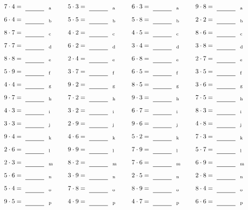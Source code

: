 \documentclass
[
  draft    = true,
  fontsize = 11pt,
  parskip  = half-
]
{scrartcl}
\begin{document}
\par\vfill\par
\begin{align*}
    \pline{7\cdot4}&=\rline{a}
  & \pline{5\cdot3}&=\rline{a}
  & \pline{6\cdot3}&=\rline{a}
  & \pline{9\cdot8}&=\rline{a} \\[1ex]
    \pline{6\cdot4}&=\rline{b}
  & \pline{5\cdot5}&=\rline{b}
  & \pline{5\cdot8}&=\rline{b}
  & \pline{2\cdot2}&=\rline{b} \\[1ex]
    \pline{8\cdot7}&=\rline{c}
  & \pline{4\cdot2}&=\rline{c}
  & \pline{4\cdot5}&=\rline{c}
  & \pline{8\cdot6}&=\rline{c} \\[1ex]
    \pline{7\cdot7}&=\rline{d}
  & \pline{6\cdot2}&=\rline{d}
  & \pline{3\cdot4}&=\rline{d}
  & \pline{3\cdot8}&=\rline{d} \\[1ex]
    \pline{8\cdot8}&=\rline{e}
  & \pline{2\cdot4}&=\rline{e}
  & \pline{6\cdot8}&=\rline{e}
  & \pline{2\cdot7}&=\rline{e} \\[1ex]
    \pline{5\cdot9}&=\rline{f}
  & \pline{3\cdot7}&=\rline{f}
  & \pline{6\cdot5}&=\rline{f}
  & \pline{3\cdot5}&=\rline{f} \\[1ex]
    \pline{4\cdot4}&=\rline{g}
  & \pline{9\cdot2}&=\rline{g}
  & \pline{8\cdot5}&=\rline{g}
  & \pline{3\cdot6}&=\rline{g} \\[1ex]
    \pline{9\cdot7}&=\rline{h}
  & \pline{7\cdot2}&=\rline{h}
  & \pline{9\cdot3}&=\rline{h}
  & \pline{7\cdot5}&=\rline{h} \\[1ex]
    \pline{4\cdot3}&=\rline{i}
  & \pline{3\cdot2}&=\rline{i}
  & \pline{6\cdot7}&=\rline{i}
  & \pline{8\cdot3}&=\rline{i} \\[1ex]
    \pline{3\cdot3}&=\rline{j}
  & \pline{2\cdot9}&=\rline{j}
  & \pline{9\cdot6}&=\rline{j}
  & \pline{4\cdot8}&=\rline{j} \\[1ex]
    \pline{9\cdot4}&=\rline{k}
  & \pline{4\cdot6}&=\rline{k}
  & \pline{5\cdot2}&=\rline{k}
  & \pline{7\cdot3}&=\rline{k} \\[1ex]
    \pline{2\cdot6}&=\rline{l}
  & \pline{9\cdot9}&=\rline{l}
  & \pline{7\cdot9}&=\rline{l}
  & \pline{5\cdot7}&=\rline{l} \\[1ex]
    \pline{2\cdot3}&=\rline{m}
  & \pline{8\cdot2}&=\rline{m}
  & \pline{7\cdot6}&=\rline{m}
  & \pline{6\cdot9}&=\rline{m} \\[1ex]
    \pline{5\cdot6}&=\rline{n}
  & \pline{3\cdot9}&=\rline{n}
  & \pline{2\cdot5}&=\rline{n}
  & \pline{2\cdot8}&=\rline{n} \\[1ex]
    \pline{5\cdot4}&=\rline{o}
  & \pline{7\cdot8}&=\rline{o}
  & \pline{8\cdot9}&=\rline{o}
  & \pline{8\cdot4}&=\rline{o} \\[1ex]
    \pline{9\cdot5}&=\rline{p}
  & \pline{4\cdot9}&=\rline{p}
  & \pline{4\cdot7}&=\rline{p}
  & \pline{6\cdot6}&=\rline{p}
\end{align*}
\end{document}
